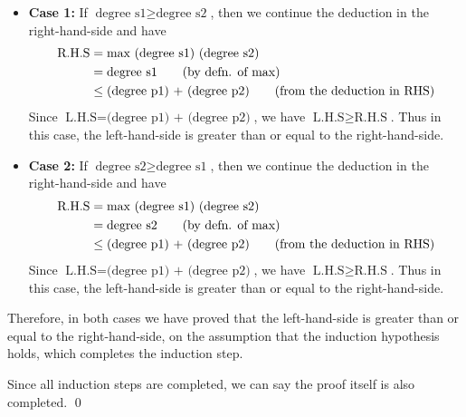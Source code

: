 \documentclass[11pt]{article}
\theoremstyle{definition}
\begin{document}
\begin{enumerate}
\begin{enumerate}[(a)]
\begin{itemize}
\begin{itemize}
\item \textbf{Case 1: }If $\text{degree s1} \geq \text{degree s2}$, then we continue the deduction in the right-hand-side 
and have
\begin{align*}
\text{R.H.S} &= \text{max (degree s1) (degree s2)} \\
			 &= \text{degree s1} \tag{\text{by defn. of max}} \\ 
			 &\leq \text{(degree p1) + (degree p2)} \tag{\text{from the deduction in RHS}} \\
\end{align*}
Since $\text{L.H.S} = \text{(degree p1) + (degree p2)}$, we have $\text{L.H.S} \geq \text{R.H.S}$. Thus in this case, 
the left-hand-side is greater than or equal to the right-hand-side.

\item \textbf{Case 2: }If $\text{degree s2} \geq \text{degree s1}$, then we continue the deduction in the right-hand-side 
and have
\begin{align*}
\text{R.H.S} &= \text{max (degree s1) (degree s2)} \\
			 &= \text{degree s2} \tag{\text{by defn. of max}} \\ 
			 &\leq \text{(degree p1) + (degree p2)} \tag{\text{from the deduction in RHS}} \\
\end{align*}
Since $\text{L.H.S} = \text{(degree p1) + (degree p2)}$, we have $\text{L.H.S} \geq \text{R.H.S}$. Thus in this case, 
the left-hand-side is greater than or equal to the right-hand-side.
\end{itemize}
Therefore, in both cases we have proved that the left-hand-side is greater than or equal to the right-hand-side,
on the assumption that the induction hypothesis holds, which completes the induction step.
\end{itemize}
Since all induction steps are completed, we can say the proof itself is also completed. \qed
\end{enumerate}

\end{enumerate}
\end{document}
